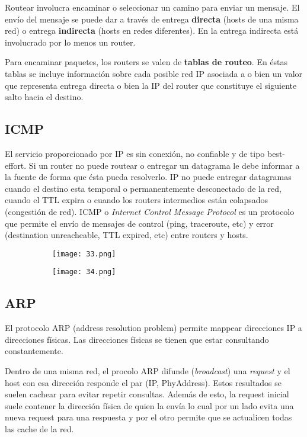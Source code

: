 \documentclass{book}
\begin{document}
	\vspace{3mm}
	Routear involucra encaminar o seleccionar un camino para enviar un mensaje. El envío del mensaje se puede dar a través de entrega \textbf{directa} (hosts de una misma red) o entrega \textbf{indirecta} (hosts en redes diferentes). En la entrega indirecta está involucrado por lo menos un router.
	
	\vspace{3mm}
	Para encaminar paquetes, los routers se valen de \textbf{tablas de routeo}. En éstas tablas se incluye información sobre cada posible red IP asociada a o bien un valor que representa entrega directa o bien la IP del router que constituye el siguiente salto hacia el destino.
	
	\subsection{ICMP}
	El servicio proporcionado por IP es sin conexión, no confiable y de tipo best-effort. Si un router no puede routear o entregar un datagrama le debe informar a la fuente de forma que ésta pueda resolverlo. IP no puede entregar datagramas cuando el destino esta temporal o permanentemente desconectado de la red, cuando el TTL expira o cuando los routers intermedios están colapsados (congestión de red). ICMP o \textit{Internet Control Message Protocol} es un protocolo que permite el envío de mensajes de control (ping, traceroute, etc) y error (destination unreacheable, TTL expired, etc) entre routers y hosts.
	
	\begin{figure}[H]
		\centering
		\begin{subfigure}[b]{0.4\textwidth}
			\centering
			\texttt{[image: 33.png]}
		\end{subfigure}
		\begin{subfigure}[b]{0.4\textwidth}
			\centering
			\texttt{[image: 34.png]}
		\end{subfigure}
	\end{figure}
	
	\subsection{ARP}
	El protocolo ARP (address resolution problem) permite mappear direcciones IP a direcciones físicas. Las direcciones físicas se tienen que estar consultando constantemente.
	
	\vspace{3mm}
	Dentro de una misma red, el procolo ARP difunde (\textit{broadcast}) una \textit{request} y el host con esa dirección responde el par (IP, PhyAddress). Estos resultados se suelen cachear para evitar repetir consultas. Además de esto, la request inicial suele contener la dirección física de quien la envía lo cual por un lado evita una nueva request para una respuesta y por el otro permite que se actualicen todas las cache de la red.
	
\end{document}
